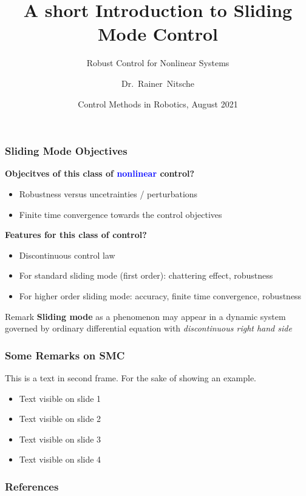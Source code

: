 \documentclass{beamer}
\title[Sliding Mode Control] %
{A short Introduction to Sliding Mode Control}
\subtitle{Robust Control for Nonlinear Systems}
\author[Rainer Nitsche] %
{Dr.~Rainer~Nitsche\inst{1}} %
\institute[Festo SE \& Co. KG] %
{
  \inst{1}%
  Dept. Robotics\\
 System Design Group
}
\date[ \today] %
{Control Methods in Robotics, August 2021}
\begin{document}
\frame{\titlepage}

\begin{frame}
\frametitle{Sliding Mode Objectives}
{\bf Objecitves of this class of \textcolor{blue}{nonlinear} control?}
\begin{itemize}
 \item Robustness versus uncetrainties / perturbations
 \item Finite time convergence towards the control objectives
\end{itemize}
\pause %
{\bf Features for this class of control?}
\begin{itemize}
 \item Discontinuous control law
 \item For standard sliding mode (first order): chattering effect, robustness
 \item For higher order sliding mode: accuracy, finite time convergence, robustness
\end{itemize}
\pause %
\begin{block}{Remark} {\bf Sliding mode} as a phenomenon may appear in
  a dynamic system governed by ordinary differential equation with
  {\em discontinuous right hand side}
\end{block}

\end{frame}

\begin{frame}
\frametitle{Some Remarks on SMC}
This is a text in second frame. 
For the sake of showing an example.

\begin{itemize}
 \item<1-> Text visible on slide 1
 \item<2-> Text visible on slide 2
 \item<3> Text visible on slide 3
 \item<4-> Text visible on slide 4
\end{itemize}
\end{frame}





\begin{frame}
\frametitle{References}
\printbibliography
\end{frame}
\end{document}
